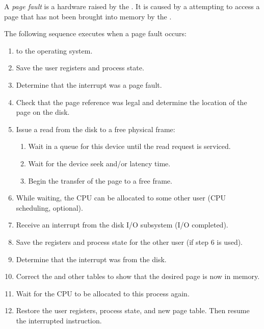 \begin{definition}\label{def:Page_Fault}
  A \emph{page fault} is a hardware  raised by the .
  It is caused by a  attempting to access a page that has not been brought into memory by the .

  The following sequence executes when a page fault occurs:
  \begin{enumerate}[noitemsep]
  \item {} to the operating system.
  \item Save the user registers and process state.
  \item Determine that the interrupt was a page fault.
  \item Check that the page reference was legal and determine the location of the page on the disk.
  \item Issue a read from the disk to a free physical frame:
    \begin{enumerate}[noitemsep]
    \item Wait in a queue for this device until the read request is serviced.
    \item Wait for the device seek and/or latency time.
    \item Begin the transfer of the page to a free frame.
    \end{enumerate}
  \item While waiting, the CPU can be allocated to some other user (CPU scheduling, optional).
  \item Receive an interrupt from the disk I/O subsystem (I/O completed).
  \item Save the registers and process state for the other user (if step 6 is used).
  \item Determine that the interrupt was from the disk.
  \item Correct the  and other tables to show that the desired page is now in memory.
  \item Wait for the CPU to be allocated to this process again.
  \item Restore the user registers, process state, and new page table. Then resume the interrupted instruction.
  \end{enumerate}
\end{definition}

